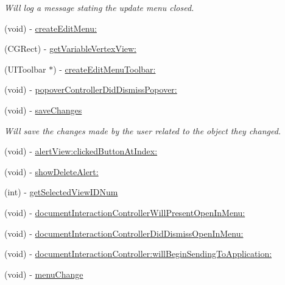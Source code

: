 \begin{DoxyCompactItemize}
\begin{DoxyCompactList}\small\item\em Will log a message stating the update menu closed. \end{DoxyCompactList}\item 
(void) -\/ \hyperlink{interface_model_section_view_controller_a831a0780f91825e4c91b2116d8806c33}{create\-Edit\-Menu\-:}
\item 
(C\-G\-Rect) -\/ \hyperlink{interface_model_section_view_controller_a3ce01e8eb3a6a32185225e1bfa51454d}{get\-Variable\-Vertex\-View\-:}
\item 
(U\-I\-Toolbar $\ast$) -\/ \hyperlink{interface_model_section_view_controller_a6a24750238ea3d59bb706b8d46e1f4c4}{create\-Edit\-Menu\-Toolbar\-:}
\item 
(void) -\/ \hyperlink{interface_model_section_view_controller_ade8553713185dc0c75c1d6f543eaa54f}{popover\-Controller\-Did\-Dismiss\-Popover\-:}
\item 
\hypertarget{interface_model_section_view_controller_acb15a33593297fd02f940207a504f2a7}{(void) -\/ \hyperlink{interface_model_section_view_controller_acb15a33593297fd02f940207a504f2a7}{save\-Changes}}\label{interface_model_section_view_controller_acb15a33593297fd02f940207a504f2a7}

\begin{DoxyCompactList}\small\item\em Will save the changes made by the user related to the object they changed. \end{DoxyCompactList}\item 
(void) -\/ \hyperlink{interface_model_section_view_controller_a2ba2c7e577a0ca5fc873237ba423f514}{alert\-View\-:clicked\-Button\-At\-Index\-:}
\item 
(void) -\/ \hyperlink{interface_model_section_view_controller_ab68e5fd03354e4a1dd1a2a75ff93dbea}{show\-Delete\-Alert\-:}
\item 
(int) -\/ \hyperlink{interface_model_section_view_controller_a1dcc9249f1500714ff1b5a63b8de3982}{get\-Selected\-View\-I\-D\-Num}
\item 
(void) -\/ \hyperlink{interface_model_section_view_controller_afc53a5989b05a1405e9ac226bb05d52c}{document\-Interaction\-Controller\-Will\-Present\-Open\-In\-Menu\-:}
\item 
(void) -\/ \hyperlink{interface_model_section_view_controller_abc178903c0b14db15612cb4a3108aacc}{document\-Interaction\-Controller\-Did\-Dismiss\-Open\-In\-Menu\-:}
\item 
(void) -\/ \hyperlink{interface_model_section_view_controller_abdb08679098f7e6ac87ead9b47dd67fa}{document\-Interaction\-Controller\-:will\-Begin\-Sending\-To\-Application\-:}
\item 
\hypertarget{interface_model_section_view_controller_ae780db37d3f6bcefbebeced10969ed12}{(void) -\/ \hyperlink{interface_model_section_view_controller_ae780db37d3f6bcefbebeced10969ed12}{menu\-Change}}\label{interface_model_section_view_controller_ae780db37d3f6bcefbebeced10969ed12}


\end{DoxyCompactItemize}
